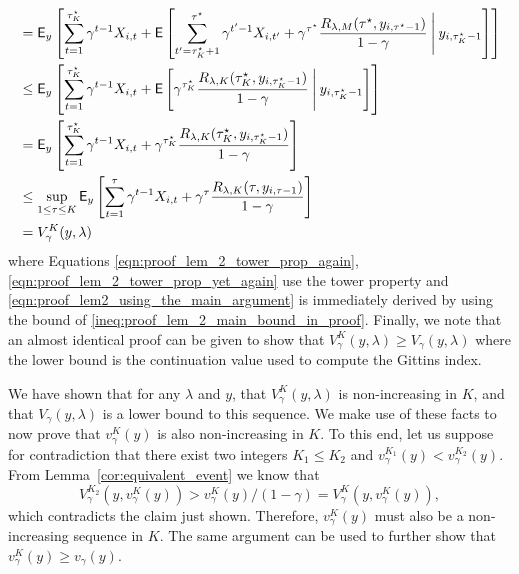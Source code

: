 \begin{myproof}[Proof.]
\begin{align}
	& = \E_{y}\left[\sum_{t=1}^{\tau^\star_K}\gamma^{t-1} X_{i,t} + \Ee{\sum_{t'=\tau^\star_K+1}^{\tau^\star}\gamma^{t'-1} X_{i,t'} +  \gamma^{\tau^\star}\frac{R_{\lambda,M}(\tau^\star, y_{i,\tau^\star-1})}{1-\gamma} \given[\Bigg] y_{i,\tau^\star_K-1} }\right] \label{eqn:proof_lem_2_tower_prop_again} \\
	& \le  \E_{y}\left[\sum_{t=1}^{\tau^\star_K}\gamma^{t-1} X_{i,t} + \Ee{\gamma^{\tau^\star_K}  \frac{R_{\lambda,K}(\tau^\star_K, y_{i,\tau^\star_K-1})}{1-\gamma} \given[\Bigg] y_{i,\tau^\star_K-1}}\right] \label{eqn:proof_lem2_using_the_main_argument} \\
	& =  \E_{y}\left[\sum_{t=1}^{\tau^\star_K}\gamma^{t-1} X_{i,t} +  \gamma^{\tau^\star_K}  \frac{R_{\lambda,K}(\tau^\star_K, y_{i,\tau^\star_K-1})}{1-\gamma}\right] \label{eqn:proof_lem_2_tower_prop_yet_again} \\
	& \le \sup_{1 \le \tau \le K}  \E_{y}\left[\sum_{t=1}^{\tau}\gamma^{t-1} X_{i,t} +  \gamma^{\tau}  \frac{R_{\lambda,K}(\tau, y_{i,\tau-1})}{1-\gamma}\right] \nonumber \\
	& = V^K_{\gamma}(y, \lambda)
	\end{align}
	where Equations \eqref{eqn:proof_lem_2_tower_prop_again}, \eqref{eqn:proof_lem_2_tower_prop_yet_again} use the tower property and \eqref{eqn:proof_lem2_using_the_main_argument} is immediately derived by using the bound of \eqref{ineq:proof_lem_2_main_bound_in_proof}. Finally, we note that an almost identical proof can be given to show that $V^K_\gamma(y, \lambda) \ge V_\gamma(y, \lambda)$ where the lower bound is the continuation value used to compute the Gittins index.
	
	We have shown that for any $\lambda$ and $y$,  that $V^K_\gamma(y, \lambda)$ is non-increasing in $K$, and that $V_\gamma(y, \lambda)$ is a lower bound to this sequence. We make use of these facts to now prove that $v^K_\gamma(y)$ is also non-increasing in $K$. To this end, let us suppose for contradiction that there exist two integers $K_1 \le K_2$ and $v^{K_1}_\gamma(y) < v^{K_2}_\gamma(y)$. From Lemma~\ref{cor:equivalent_event} we know that
	\begin{equation}
		V^{K_2}_\gamma(y, v^K_\gamma(y)) > v^K_\gamma(y)/(1-\gamma) = V^K_\gamma(y, v^K_\gamma(y)),
	\end{equation}
	which contradicts the claim just shown. Therefore, $v^K_\gamma(y)$ must also be a  non-increasing sequence in $K$. The same argument can be used to further show that $v^K_\gamma(y) \ge v_\gamma(y)$.
	

\end{myproof}
